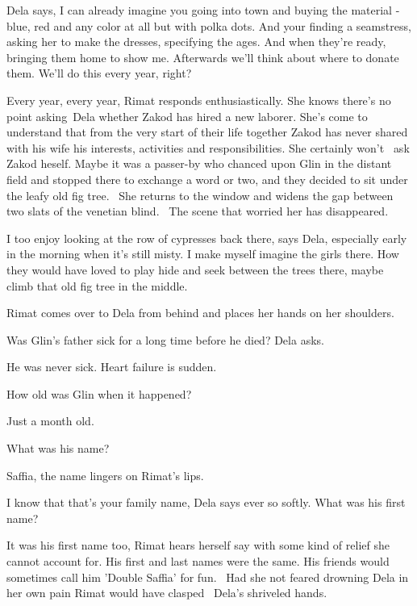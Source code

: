 \documentclass[letterpaper]{article}
\begin{document}
Dela says, {\textquotedbl}I can already imagine you going into town and buying the material - blue, red and any color at
all but with polka dots. And your finding a seamstress, asking her to make the dresses, specifying the ages. And when
they're ready, bringing them home to show me. Afterwards we'll think about where to donate them. We'll do this every
year, right?{\textquotedbl}

{\textquotedbl}Every year, every year,{\textquotedbl} Rimat responds enthusiastically. She knows there's no point
asking~Dela whether Zakod has hired a new laborer. She's come to understand that from the very start of their life
together Zakod has never shared with his wife his interests, activities and responsibilities{. }She
certainly won't {\ }ask Zakod heself. Maybe it was a passer-by who chanced upon Glin in the distant
field and stopped there to exchange a word or two, and they decided to sit under the{ }leafy old fig
tree. ~She returns to the window and widens the gap between two slats of the venetian blind. ~The scene that worried
her has disappeared. 

{\textquotedbl}I too enjoy looking at the row of cypresses back there,{\textquotedbl} says Dela,
{\textquotedbl}especially early in the morning when it's still misty. I make myself imagine the girls there. How they
would have loved to play hide and seek between the trees there, maybe climb that old fig tree in the
middle.{\textquotedbl}

Rimat comes over to Dela from behind and places her hands on her shoulders. 

{\textquotedbl}Was Glin's father sick for a long time before he died?{\textquotedbl} Dela asks.

{\textquotedbl}He was never sick. Heart failure is sudden.{\textquotedbl}

{\textquotedbl}How old was Glin when it happened?{\textquotedbl}

{\textquotedbl}Just a month old.{\textquotedbl}

{\textquotedbl}What was his name?{\textquotedbl}

{\textquotedbl}Saffia,{\textquotedbl} the name lingers on Rimat's lips.

{\textquotedbl}I know that that's your family name,{\textquotedbl} Dela says ever so softly. {\textquotedbl}What was his
first name?{\textquotedbl} 

{\textquotedbl}It was his first name too,{\textquotedbl} Rimat hears herself say with some kind of relief she cannot
account for. {\textquotedbl}His first and last names were the same. His friends would sometimes call him 'Double
Saffia' for fun.{\textquotedbl} \ Had she not feared drowning Dela in her own pain Rimat would have clasped \ Dela's
shriveled hands. 
\end{document}
